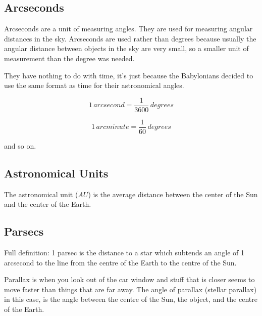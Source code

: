 \documentclass[a4paper, 12pt]{article}
\begin{document}
\subsection {Arcseconds}

Arcseconds are a unit of measuring angles. They are used for measuring angular distances in the sky. Arcseconds are used rather than degrees because usually the angular distance between objects in the sky are very small, so a smaller unit of measurement than the degree was needed.

They have nothing to do with time, it's just because the Babylonians decided to use the same format as time for their astronomical angles.

$$
1 \, arcsecond = \frac{1}{3600} \, degrees
$$

$$
1 \, arcminute = \frac{1}{60} \, degrees
$$

and so on.

\subsection{Astronomical Units}

The astronomical unit ($AU$) is the average distance between the center of the Sun and the center of the Earth.

\subsection{Parsecs}

Full definition: 1 parsec is the distance to a star which subtends an angle of 1 arcsecond to the line from the centre of the Earth to the centre of the Sun.

Parallax is when you look out of the car window and stuff that is closer seems to move faster than things that are far away. The angle of parallax (stellar parallax) in this case, is the angle between the centre of the Sun, the object, and the centre of the Earth.
\end{document}
